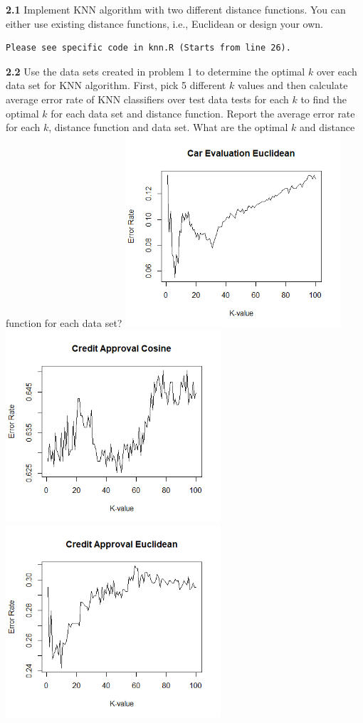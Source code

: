 \documentclass{article}
\begin{document}
\textbf{2.1}  Implement KNN algorithm with two different distance functions. You can either use existing distance functions, i.e., Euclidean  or design your own.
\begin{verbatim}
Please see specific code in knn.R (Starts from line 26).
\end{verbatim}
\pagebreak
\textbf{2.2}  Use the data sets created in problem 1 to determine the optimal $k$  over each data set for KNN algorithm. First, pick 5  different $k$ values and then calculate average error rate of  KNN classifiers over test data tests  for each $k$ to find the optimal $k$ for each data set and distance function. Report the average error rate for each $k$, distance function and data set.  What are the optimal $k$ and distance function for each data set?
\includegraphics[width=8cm]{CarEvaluationEuclidean.PNG}
\includegraphics[width=8cm]{CarEvaluationCosine.PNG}
\\
\includegraphics[width=8cm]{CreditApprovalEuclidean.PNG}
\end{document}
